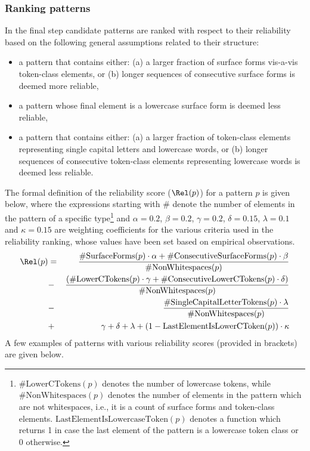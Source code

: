 \documentclass[output=paper]{langsci/langscibook}
\begin{document}
\subsubsection{Ranking patterns} In the final step candidate patterns are ranked with respect to their reliability based on the
following general assumptions related to their structure: 
\begin{itemize}
\item a pattern that contains either: (a) a larger fraction of surface forms vis-a-vis token-class elements, or (b) longer sequences of consecutive surface forms is deemed more reliable,
\item a pattern whose final element is a lowercase surface form is deemed less reliable,
\item a pattern that contains either: (a) a larger fraction of token-class elements representing single capital letters and lowercase words,
or (b) longer sequences of consecutive token-class elements representing lowercase words is deemed less reliable.
\end{itemize}

The formal definition of the reliability score ($\Rel(p)$) for a pattern $p$ is given below, where the expressions starting with $\#$ denote the number of elements in the pattern of a specific type\footnote{$\#\text{LowerCTokens}(p)$ denotes the number of lowercase tokens, while $\#\text{NonWhitespaces}(p)$ denotes the number of elements in the pattern which are not whitespaces, i.e., it is a count of surface forms and token-class elements. $\text{LastElementIsLowercaseToken}(p)$ denotes a function which returns 1 in case the last element of the pattern is a lowercase token class or 0 otherwise.} and $\alpha=0.2$, $\beta=0.2$, $\gamma=0.2$, $\delta=0.15$, $\lambda=0.1$ and $\kappa=0.15$ are weighting coefficients for the various criteria used in the reliability ranking, whose values have been set based on empirical observations.  
\begin{eqnarray*}
\Rel(p) & = & \frac{\#\text{SurfaceForms}(p) \cdot \alpha +
  \#\text{ConsecutiveSurfaceForms}(p) \cdot \beta}{\#\text{NonWhitespaces}(p)} \\ &
- & \frac{(\#\text{LowerCTokens}(p) \cdot \gamma +
  \#\text{ConsecutiveLowerCTokens}(p) \cdot \delta)}{\#\text{NonWhitespaces}(p)}\\ &
- & \frac{\#\text{SingleCapitalLetterTokens}(p) \cdot
  \lambda}{\#\text{NonWhitespaces}(p)}\\ & + & \gamma + \delta + \lambda + (1
- \text{LastElementIsLowerCToken}(p)) \cdot \kappa \\
\end{eqnarray*}
A few examples of patterns with various reliability scores
(provided in brackets) are given below.
\end{document}
